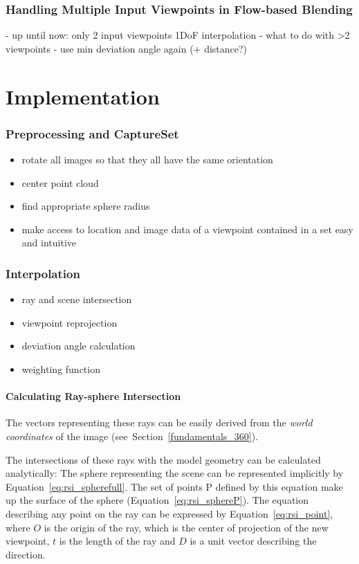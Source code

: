 \subsubsection{Handling Multiple Input Viewpoints in Flow-based Blending}
- up until now: only 2 input viewpoints \ar 1DoF interpolation
- what to do with >2 viewpoints
- use min deviation angle again (+ distance?)

\section{Implementation}

\subsubsection{Preprocessing and CaptureSet}
\begin{itemize}
  \item rotate all images so that they all have the same orientation
  \item center point cloud
  \item find appropriate sphere radius
  \item make access to location and image data of a viewpoint contained in a set easy and intuitive
\end{itemize}

\subsubsection{Interpolation}
\begin{itemize}
  \item ray and scene intersection
  \item viewpoint reprojection
  \item deviation angle calculation
  \item weighting function
\end{itemize}

\paragraph{Calculating Ray-sphere Intersection}
The vectors representing these rays can be easily derived from the \emph{world coordinates} of the image (see~Section~\ref{fundamentals_360}).

The intersections of these rays with the model geometry can be calculated analytically: The sphere representing the scene can be represented implicitly by Equation~\ref{eq:rsi_spherefull}. The set of points P defined by this equation make up the surface of the sphere (Equation~\ref{eq:rsi_sphereP}). 
The equation describing any point on the ray can be expressed by Equation~\ref{eq:rsi_point}, where $O$ is the origin of the ray, which is the center of projection of the new viewpoint, $t$ is the length of the ray and $D$ is a unit vector describing the direction. 

